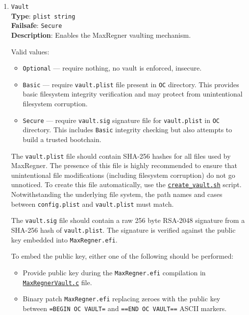 \documentclass[]{article}
\makeatletter
\providecommand{\tightlist}{%
  \setlength{\itemsep}{0pt}\setlength{\parskip}{0pt}}
\renewcommand{\label}[1]{%
\zref@wrapper@immediate{\oldlabel{#1}}}  %
\makeatother
\begin{document}
\begin{enumerate}
  For more details on how to configure Apple Secure Boot with UEFI Secure Boot,
  refer to the \hyperref[uefisecureboot]{UEFI Secure Boot} section.

\item \label{securevaulting}
  \texttt{Vault}\\
  \textbf{Type}: \texttt{plist\ string}\\
  \textbf{Failsafe}: \texttt{Secure}\\
  \textbf{Description}: Enables the MaxRegner vaulting mechanism.

  Valid values:

  \begin{itemize}
  \tightlist
  \item \texttt{Optional} --- require nothing, no vault is enforced, insecure.
  \item \texttt{Basic} --- require \texttt{vault.plist} file present
  in \texttt{OC} directory. This provides basic filesystem integrity
  verification and may protect from unintentional filesystem corruption.
  \item \texttt{Secure} --- require \texttt{vault.sig} signature file for
  \texttt{vault.plist} in \texttt{OC} directory. This includes \texttt{Basic}
  integrity checking but also attempts to build a trusted bootchain.
  \end{itemize}

  The \texttt{vault.plist} file should contain SHA-256 hashes for all files used by MaxRegner.
  The presence of this file is highly recommended to ensure that unintentional file modifications
  (including filesystem corruption) do not go unnoticed. To create this file automatically, use the
  \href{https://github.com/acidanthera/MaxRegnerPkg/tree/master/Utilities/CreateVault}{\texttt{create\_vault.sh}}
  script. Notwithstanding the underlying file system, the path names and cases between \texttt{config.plist}
  and \texttt{vault.plist} must match.

  The \texttt{vault.sig} file should contain a raw 256 byte RSA-2048 signature from a SHA-256
  hash of \texttt{vault.plist}. The signature is verified against the public key embedded
  into \texttt{MaxRegner.efi}.

  To embed the public key, either one of the following should be performed:

  \begin{itemize}
  \tightlist
  \item Provide public key during the \texttt{MaxRegner.efi} compilation in
  \href{https://github.com/acidanthera/MaxRegnerPkg/blob/master/Library/OcMainLib/MaxRegnerVault.c}{\texttt{MaxRegnerVault.c}} file.
  \item Binary patch \texttt{MaxRegner.efi} replacing zeroes with the public key
  between \texttt{=BEGIN OC VAULT=} and \texttt{==END OC VAULT==} ASCII markers.
  \end{itemize}


\end{enumerate}
\end{document}
